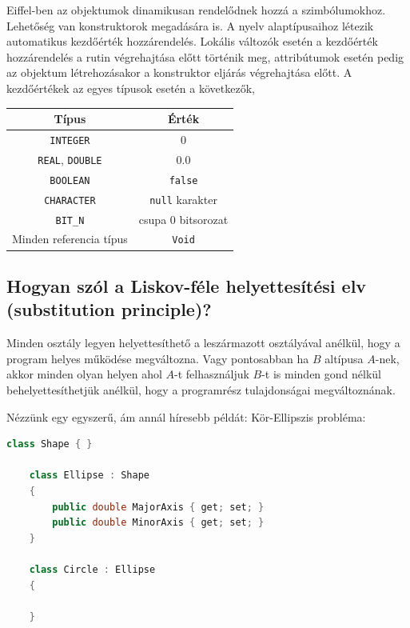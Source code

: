 	Eiffel-ben az objektumok dinamikusan rendelődnek hozzá a szimbólumokhoz. Lehetőség van konstruktorok megadására is. A nyelv alaptípusaihoz létezik automatikus kezdőérték hozzárendelés. Lokális változók esetén a kezdőérték hozzárendelés a rutin végrehajtása előtt történik meg, attribútumok esetén pedig az objektum létrehozásakor a konstruktor eljárás végrehajtása előtt. A kezdőértékek az egyes típusok esetén a következők,
	\begin{center}
		\begin{tabular}{|c|c|}\hline
			Típus																	& Érték\\\hline
			\lstinline[language=Eiffel]|INTEGER|     							   	& 0\\
			\lstinline[language=Eiffel]|REAL|, \lstinline[language=Eiffel]|DOUBLE| 	& 0.0\\
			\lstinline[language=Eiffel]|BOOLEAN|								   	& \lstinline[language=Eiffel]|false|\\
			\lstinline[language=Eiffel]|CHARACTER|	                               	& \lstinline[language=Eiffel]|null| karakter \\
			\lstinline[language=Eiffel]|BIT_N|										& csupa 0 bitsorozat\\
			Minden referencia típus 												& \lstinline[language=Eiffel]|Void|\\\hline
		\end{tabular}
	\end{center}
	
\subsection{ Hogyan szól a Liskov-féle helyettesítési elv (substitution principle)? }
	Minden osztály legyen helyettesíthető a leszármazott osztályával anélkül, hogy a program helyes működése megváltozna. Vagy pontosabban ha $B$ altípusa $A$-nek, akkor minden olyan helyen ahol $A$-t felhasználjuk $B$-t is minden gond nélkül behelyettesíthetjük anélkül, hogy a programrész tulajdonságai megváltoznának.
	
	Nézzünk egy egyszerű, ám annál híresebb példát: Kör-Ellipszis probléma:
	\begin{lstlisting}[language=C++]
	class Shape { }
	
	class Ellipse : Shape
	{
		public double MajorAxis { get; set; }
		public double MinorAxis { get; set; }
	}
	
	class Circle : Ellipse
	{
	
	}
	\end{lstlisting}
	
